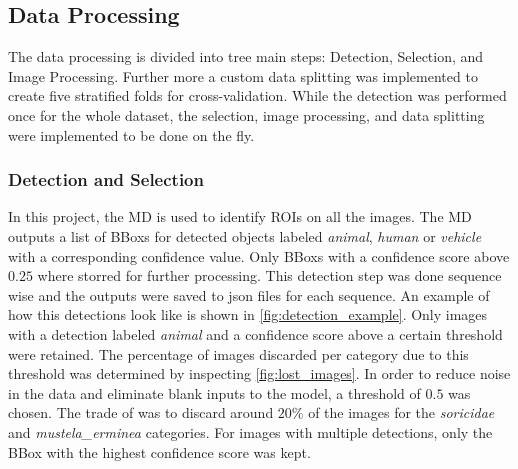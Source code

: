     \subsection{Data Processing}

    The data processing is divided into tree main steps: Detection, Selection, and Image Processing. 
    Further more a custom data splitting was implemented to create five stratified folds for cross-validation.
    While the detection was performed once for the whole dataset, the selection, image processing, and data splitting were implemented to be done on the fly.

        \subsubsection{Detection and Selection}
    
        In this project, the \ac{MD} \autocite{morrisEfficientPipelineCamera2025} is used to identify \acp{ROI} on all the images.
        The \ac{MD} outputs a list of \acp{BBox} for detected objects labeled \textit{animal}, \textit{human} or \textit{vehicle} with a corresponding confidence value.
        Only \acp{BBox} with a confidence score above \(0.25\) where storred for further processing.
        This detection step was done sequence wise and the outputs were saved to json files for each sequence.
        An example of how this detections look like is shown in \autoref{fig:detection_example}.
        Only images with a detection labeled \textit{animal} and a confidence score above a certain threshold were retained.  
        The percentage of images discarded per category due to this threshold was determined by inspecting \autoref{fig:lost_images}.  
        In order to reduce noise in the data and eliminate blank inputs to the model, a threshold of \(0.5\) was chosen.
        The trade of was to discard around \(20\%\) of the images for the \textit{soricidae} and \textit{mustela\_erminea} categories.
        For images with multiple detections, only the \ac{BBox} with the highest confidence score was kept.

